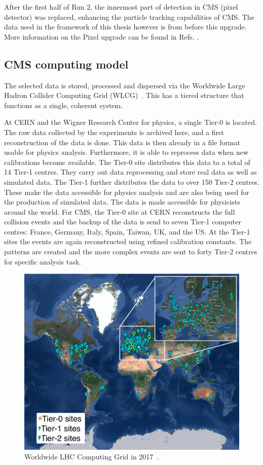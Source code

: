 After the first half of Run 2, the innermost part of detection in CMS (pixel detector) was replaced, enhancing the particle tracking capabilities of CMS. The data used in the framework of this thesis however is from before this upgrade. More information on the Pixel upgrade can be found in Refs. \cite{CMS:2012sda,Perrey:1644757}.

\subsection{CMS computing model}
\label{sec:Computing}
The selected data is stored, processed and dispersed via the Worldwide Large Hadron Collider Computing Grid (WLCG)~\cite{Grandi:814248,Eck:840543}. This has a tiered structure that functions as a single, coherent system. 

At CERN and the Wigner Research Center for physics, a single Tier-0 is located. The raw data collected by the experiments is archived here, and a first reconstruction of the data is done. This data is then already in a file format usable for physics analysis. Furthermore, it is able to reprocess data when new calibrations become available. The Tier-0 site distributes this data to a total of 14 Tier-1 centres. They carry out data reprocessing and store real data as well as simulated  data. The Tier-1 further distributes the data to over 150 Tier-2 centres. These make the data accessible for physics analysis and are also being used for the production of simulated data. The data is made accessible for  physicists around the world. For CMS, the Tier-0 site at CERN reconstructs the full collision events and the backup of the data is send to seven Tier-1 computer centres: France, Germany, Italy, Spain, Taiwan, UK, and the US. At the Tier-1 sites the events are again reconstructed using refined calibration constants. The patterns are created and the more complex events are sent to forty Tier-2 centres for specific analysis task. 
\begin{figure}[htbp]
	\centering
	\includegraphics[width=1.\linewidth]{2_ExperimentalSetup/Figures/WLHCG}
	\caption{Worldwide LHC Computing Grid in 2017~\cite{WLCG}.}
	\label{fig:wlhcg}
\end{figure}
